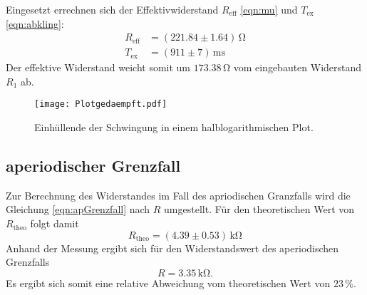 Eingesetzt errechnen sich der Effektivwiderstand $R_\text{eff}$ \eqref{eqn:mu} und $T_\text{ex}$ \eqref{eqn:abkling}:
\begin{align*}
  R_\text{eff} &= (221.84 \pm 1.64)\,\si{\ohm}\\
  T_\text{ex} &= (911 \pm 7)\,\si{\milli\second}
\end{align*}
Der effektive Widerstand weicht somit um $173.38 \, \si{\ohm}$ vom eingebauten Widerstand $R_\text{1}$ ab.

\begin{figure}[h!]
  \centering
  \texttt{[image: Plotgedaempft.pdf]}
  \caption{Einhüllende der Schwingung in einem halblogarithmischen Plot.}
  \label{fig:efunc}
\end{figure}

\subsection{aperiodischer Grenzfall}
Zur Berechnung des Widerstandes im Fall des apriodischen Granzfalls wird die Gleichung \eqref{eqn:apGrenzfall} nach $R$ umgestellt.
Für den theoretischen Wert von $R_\text{theo}$ folgt damit
\begin{equation}
  R_\text{theo} = (4.39 \pm 0.53) \, \si{\kilo\ohm} %
\end{equation}
Anhand der Messung ergibt sich für den Widerstandswert des aperiodischen Grenzfalls
\begin{equation}
  R =  3.35 \, \si{\kilo\ohm}.
\end{equation}
Es ergibt sich somit eine relative Abweichung vom theoretischen Wert von $23 \, \si{\percent}$.

